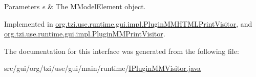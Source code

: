 \begin{DoxyParams}{Parameters}
{\em e} & The M\-Model\-Element object. \\
\hline
\end{DoxyParams}


Implemented in \hyperlink{classorg_1_1tzi_1_1use_1_1runtime_1_1gui_1_1impl_1_1_plugin_m_m_h_t_m_l_print_visitor_abe883aa23209e53d8f810ae6010c77b4}{org.\-tzi.\-use.\-runtime.\-gui.\-impl.\-Plugin\-M\-M\-H\-T\-M\-L\-Print\-Visitor}, and \hyperlink{classorg_1_1tzi_1_1use_1_1runtime_1_1gui_1_1impl_1_1_plugin_m_m_print_visitor_a6c1e531e203d855fa92a379039000f5c}{org.\-tzi.\-use.\-runtime.\-gui.\-impl.\-Plugin\-M\-M\-Print\-Visitor}.



The documentation for this interface was generated from the following file\-:\begin{DoxyCompactItemize}
\item 
src/gui/org/tzi/use/gui/main/runtime/\hyperlink{_i_plugin_m_m_visitor_8java}{I\-Plugin\-M\-M\-Visitor.\-java}\end{DoxyCompactItemize}
